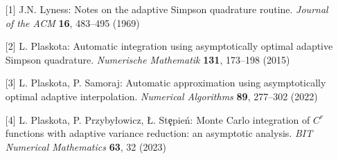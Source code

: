 \begin{talk}
\begin{enumerate}

\item[{[1]}]
J.N. Lyness: Notes on the adaptive Simpson quadrature routine. {\em Journal of the ACM} {\bf 16}, 483--495 (1969)

\item[{[2]}] 
L. Plaskota: Automatic integration using asymptotically optimal adaptive Simpson quadrature. {\em Numerische Mathematik} {\bf 131}, 173--198 (2015)

\item[{[3]}]
L. Plaskota, P. Samoraj: Automatic approximation using asymptotically optimal adaptive interpolation. {\it Numerical Algorithms} {\bf 89}, 277--302 (2022)

\item[{[4]}]
L. Plaskota, P. Przyby{\l}owicz, {\L}. St\c epie\'{n}: Monte Carlo integration of $C^r$ functions with adaptive variance reduction: an asymptotic analysis. {\em BIT Numerical Mathematics} {\bf 63}, 32 (2023)
\end{enumerate}			
				
\end{talk}

